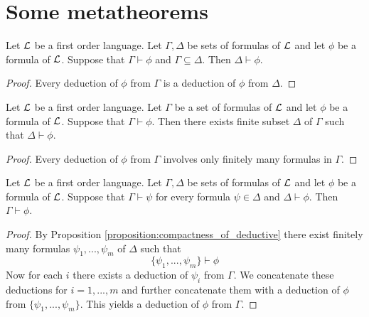 \section{Some metatheorems}

\begin{proposition}\label{proposition:monotonicity_of_deductive}
Let ${\mathcal L}$ be a first order language. Let $\Gamma, \Delta$ be sets of formulas of ${\mathcal L}$ and let $\phi$ be a formula of ${\mathcal L}$. Suppose that $\Gamma \vdash \phi$ and $\Gamma \subseteq \Delta$. Then $\Delta \vdash \phi$.
\end{proposition}
\begin{proof}
Every deduction of $\phi$ from $\Gamma$ is a deduction of $\phi$ from $\Delta$.
\end{proof}

\begin{proposition}\label{proposition:compactness_of_deductive}
Let ${\mathcal L}$ be a first order language. Let $\Gamma$ be a set of formulas of ${\mathcal L}$ and let $\phi$ be a formula of ${\mathcal L}$. Suppose that $\Gamma \vdash \phi$. Then there exists finite subset $\Delta$ of $\Gamma$ such that $\Delta \vdash \phi$.
\end{proposition}
\begin{proof}
Every deduction of $\phi$ from $\Gamma$ involves only finitely many formulas in $\Gamma$.
\end{proof}

\begin{proposition}\label{proposition:transitivity_of_deductive}
Let ${\mathcal L}$ be a first order language. Let $\Gamma, \Delta$ be sets of formulas of ${\mathcal L}$ and let $\phi$ be a formula of ${\mathcal L}$. Suppose that $\Gamma \vdash \psi$ for every formula $\psi \in \Delta$ and $\Delta \vdash \phi$. Then $\Gamma \vdash \phi$.
\end{proposition}
\begin{proof}
By Proposition \ref{proposition:compactness_of_deductive} there exist finitely many formulas $\psi_1,...,\psi_m$ of $\Delta$ such that
$$\{\psi_1,...,\psi_m\} \vdash \phi$$
Now for each $i$ there exists a deduction of $\psi_i$ from $\Gamma$. We concatenate these deductions for $i = 1,...,m$ and further concatenate them with a deduction of $\phi$ from $\{\psi_1,...,\psi_m\}$. This yields a deduction of $\phi$ from $\Gamma$.
\end{proof}

